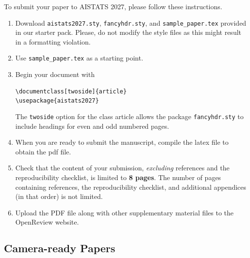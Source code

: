 \documentclass[twoside]{article}
\begin{document}
To submit your paper to AISTATS 2027, please follow these instructions.

\begin{enumerate}
    \item Download \texttt{aistats2027.sty}, \texttt{fancyhdr.sty}, and \texttt{sample\_paper.tex} provided in our starter pack.
    Please, do not modify the style files as this might result in a formatting violation.

    \item Use \texttt{sample\_paper.tex} as a starting point.
    \item Begin your document with
    \begin{flushleft}
    \texttt{\textbackslash documentclass[twoside]\{article\}}\\
    \texttt{\textbackslash usepackage\{aistats2027\}}
    \end{flushleft}
    The \texttt{twoside} option for the class article allows the
    package \texttt{fancyhdr.sty} to include headings for even and odd
    numbered pages.
    \item When you are ready to submit the manuscript, compile the latex file to obtain the pdf file.
    \item Check that the content of your submission, \emph{excluding} references and the reproducibility checklist, is limited to \textbf{8 pages}. The number of pages containing references, the reproducibility checklist, and additional appendices (in that order) is not limited.
    \item Upload the PDF file along with other supplementary material files to the OpenReview website.
\end{enumerate}

\subsection{Camera-ready Papers}

\end{document}
